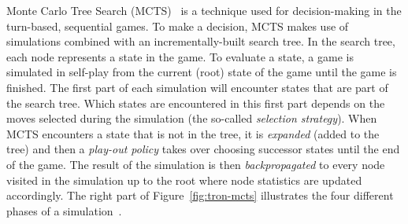 \documentclass{article}
\begin{document}
Monte Carlo Tree Search (MCTS)~\cite{coulom, kocsis} is a technique used for decision-making in the turn-based, 
sequential games. 
To make a decision, MCTS makes use of simulations combined with an incrementally-built search tree. 
In the search tree, each node represents a state in the game. To evaluate a state, a game is simulated in self-play from the current (root) state of the game until the game is finished. The first part of each simulation will encounter states that are part of the search tree. Which states are encountered in this first part depends on the moves selected during the simulation (the so-called {\it selection strategy}). When MCTS encounters a state that is not in the tree, it is {\it expanded} (added to the tree) and then a {\it play-out policy} takes over choosing successor states until the end of the game. 
The result of the simulation is then {\it backpropagated} to every node visited in the simulation up to the root where 
node statistics are updated accordingly.
The right part of Figure~\ref{fig:tron-mcts} illustrates the four different phases of a simulation~\cite{ChaslotWHUB2008}.
\end{document}
